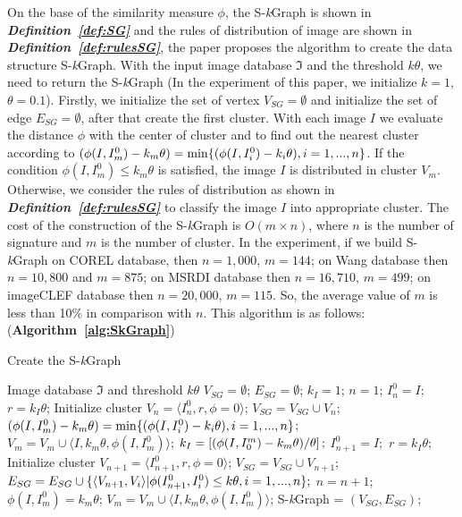 \documentclass{amcs}
\begin{document}
On the base of the similarity measure $\phi$, the S-\textit{k}Graph is shown in \textit{\textbf{Definition~\ref{def:SG}}} and the rules of distribution of image are shown in \textit{\textbf{Definition~\ref{def:rulesSG}}}, the paper proposes the algorithm to create the data structure S-\textit{k}Graph. With the input image database $\Im $ and the threshold $k\theta$, we need to return the S-\textit{k}Graph (In the experiment of this paper, we initialize $k=1$, $\theta = 0.1$). Firstly, we initialize the set of vertex ${V_{SG}} = \emptyset $ and initialize the set of edge ${E_{SG}} = \emptyset $, after that create the first cluster. With each image $I$ we evaluate the distance $\phi $ with the center of cluster and to find out the nearest cluster according to $(\phi (I,I_m^0) - {k_m}\theta ) = \min \{ (\phi (I,I_i^0) - {k_i}\theta ),i = 1,...,n{\rm{\} }}$. If the condition $\phi (I,I_m^0) \le {k_m}\theta $ is satisfied, the image $I$ is distributed in cluster ${V_m}$. Otherwise, we consider the rules of distribution as shown in \textit{\textbf{Definition~\ref{def:rulesSG}}} to classify the image $I$ into appropriate cluster. The cost of the construction of the S-\textit{k}Graph is $O(m \times n)$, where $n$ is the number of signature and $m$ is the number of cluster. In the experiment, if we build S-\textit{k}Graph on COREL database, then $n = 1,000$, $m = 144$; on Wang database then $n = 10,800$ and $m = 875$; on MSRDI database then $n = 16,710$, $m = 499$; on imageCLEF database then $n = 20,000$, $m = 115$. So, the average value of $m$ is less than 10\% in comparison with $n$. This algorithm is as follows: (\textbf{Algorithm~\ref{alg:SkGraph}})
\begin{algorithm}[!ht]
\caption{Create the S-\textit{k}Graph}
\label{alg:SkGraph}
\begin{algorithmic}[1]
\REQUIRE Image database $\Im $ and threshold $k\theta $
\STATE ${V_{SG}} = \emptyset$; ${E_{SG}} = \emptyset$; ${k_I} = 1$; $n = 1$;
		\STATE $I_n^0 = I;$ $r = {k_I}\theta$;
		\STATE Initialize cluster ${V_n} = \langle I_n^0,r,\phi  = 0\rangle$;
		\STATE ${V_{SG}} = {V_{SG}} \cup {V_n}$;
	\ELSE
		\STATE $(\phi (I,I_m^0) - {k_m}\theta ) = \min \{ (\phi (I,I_i^0) - {k_i}\theta ),i = 1,...,n{\rm{\} }}$;
			\STATE ${V_m} = {V_m} \cup \langle I,{k_m}\theta ,\phi (I,I_m^0)\rangle$;
		\ELSE 
			\STATE ${k_I} = \left[ {{{(\phi (I,I_0^m) - {k_m}\theta )} \mathord{\left/
							{\vphantom {{(\phi (I,I_0^m) - {k_m}\theta )} \theta }} \right.
							\kern-\nulldelimiterspace} \theta }} \right];$
				\STATE $I_{n + 1}^0 = I;$ $r = {k_I}\theta$;
				\STATE Initialize cluster ${V_{n + 1}} = \langle I_{n + 1}^0,r,\phi  = 0\rangle$;
				\STATE ${V_{SG}} = {V_{SG}} \cup {V_{n + 1}}$;
				\STATE ${E_{SG}} = {E_{SG}} \cup {\rm{\{ }}\langle {V_{n + 1}},{V_i}\rangle |\phi (I_{n + 1}^0,I_i^0) \le k\theta ,i = 1,...,n{\rm{\} }};$
				\STATE $n = n + 1$;
			\ELSE
				\STATE $\phi (I,I_m^0) = {k_m}\theta$;
				\STATE ${V_m} = {V_m} \cup \langle I,{k_m}\theta ,\phi (I,I_m^0)\rangle$;
			\ENDIF
		\ENDIF
	\ENDIF
	\ENDFOR
	\RETURN S-\textit{k}Graph = $({V_{SG}},{E_{SG}})$;
\end{algorithmic}
\end{algorithm}
\end{document}
